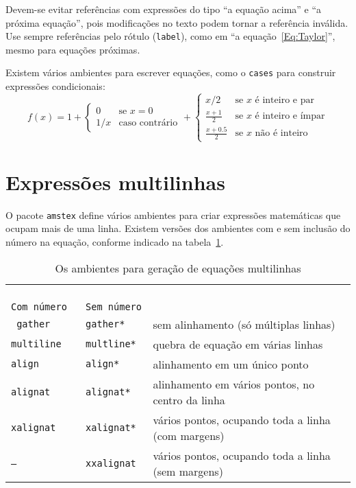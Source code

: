 Devem-se evitar referências com expressões do tipo ``a equação acima''
e ``a próxima equação'', pois modificações no texto podem tornar a
referência inválida. Use sempre referências pelo rótulo
(\texttt{label}), como em ``a equação~\ref{Eq:Taylor}'', mesmo para
equações próximas.

Existem vários ambientes para escrever equações, como o \verb|cases|
para construir expressões condicionais:
\begin{equation}
f(x) = 1+\begin{cases}
0   & \text{se $x=0$}\\
1/x & \text{caso contrário}
\end{cases} + \begin{cases}
x/2             & \text{se $x$ é inteiro e par}\\
\frac{x+1}{2}   & \text{se $x$ é inteiro e ímpar}\\
\frac{x+0.5}{2} & \text{se $x$ não é inteiro}
\end{cases}
\end{equation}

\section{Expressões multilinhas}
\label{Sec:multilinhas}

O pacote \texttt{amstex} define vários ambientes para criar expressões
matemáticas que ocupam mais de uma linha. Existem versões dos
ambientes com e sem inclusão do número na equação, conforme indicado
na tabela~\ref{Tab:multilinhas}\footnotemark.

\begin{table}[htbp]
\begin{center}
\newlength{\LL}
\settowidth{\LL}{Tipo de alinhamento}
\begin{tabular}{|>{\tt}l|>{\tt}l|l|} \hline
\multicolumn{2}{|c|}{PACOTE} &
\multicolumn{1}{c|}{\multirow{2}{\LL}{Tipo de alinhamento}}
\\ \cline{1-2}
\textrm{Com número} & \textrm{Sem número} &  \\ \hline
gather & gather* & sem alinhamento (só múltiplas linhas) \\
multiline & multline* & quebra de equação em várias linhas \\
align & align* & alinhamento em um único ponto \\
alignat & alignat* & alinhamento em vários pontos, no centro da linha\\
xalignat & xalignat* & vários pontos, ocupando toda a linha (com margens)\\
-- & xxalignat & vários pontos, ocupando toda a linha (sem margens)
\\ \hline
\end{tabular}
\end{center}
\caption{Os ambientes para geração de equações multilinhas}
\label{Tab:multilinhas}
\end{table}

